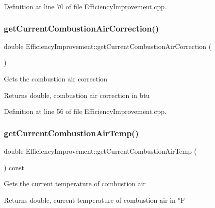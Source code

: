 Definition at line 70 of file Efficiency\+Improvement.\+cpp.

\mbox{\label{class_efficiency_improvement_af50c396ac8ee18f594d6e8b8814f056a}} 
\subsubsection{\texorpdfstring{get\+Current\+Combustion\+Air\+Correction()}{getCurrentCombustionAirCorrection()}}
{\footnotesize\ttfamily double Efficiency\+Improvement\+::get\+Current\+Combustion\+Air\+Correction (\begin{DoxyParamCaption}{ }\end{DoxyParamCaption})}

Gets the combustion air correction

\begin{DoxyReturn}{Returns}
double, combustion air correction in btu 
\end{DoxyReturn}


Definition at line 56 of file Efficiency\+Improvement.\+cpp.

\mbox{\label{class_efficiency_improvement_aa2f9d297f3c31e249c7a8035fd5602f1}} 
\subsubsection{\texorpdfstring{get\+Current\+Combustion\+Air\+Temp()}{getCurrentCombustionAirTemp()}}
{\footnotesize\ttfamily double Efficiency\+Improvement\+::get\+Current\+Combustion\+Air\+Temp (\begin{DoxyParamCaption}{ }\end{DoxyParamCaption}) const\hspace{0.3cm}{\ttfamily [inline]}}

Gets the current temperature of combustion air

\begin{DoxyReturn}{Returns}
double, current temperature of combustion air in °F 
\end{DoxyReturn}


